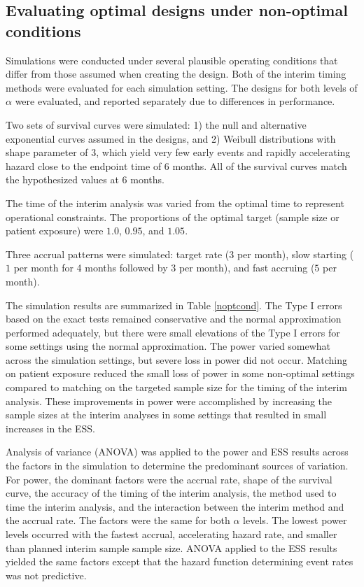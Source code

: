 \documentclass[12pt]{article}
\begin{document}
\clearpage

\subsection{Evaluating optimal designs under non-optimal conditions}
\label{simulations}

Simulations were conducted under several plausible operating conditions that differ from those
assumed when creating the design.  Both of the interim timing methods were evaluated for each simulation setting.  The designs for both levels of
$\alpha$ were evaluated, and reported separately due to differences in performance.

Two sets of survival curves were simulated: 1) the null and alternative exponential curves assumed in the designs, and 2) Weibull distributions with shape parameter of $3$, which yield very few early events and rapidly accelerating hazard close to the endpoint time of $6$ months.  All of the survival curves match the hypothesized values at $6$ months.

The time of the interim analysis was varied from the optimal time to represent operational
constraints. The proportions of the optimal target (sample size or patient exposure) were $1.0$,
$0.95$, and $1.05$.

Three accrual patterns were simulated:  target rate (3 per month), slow starting ($1$ per month for 4 months followed by $3$ per month), and fast accruing ($5$ per month).

The simulation results are summarized in Table \ref{noptcond}.  The Type I errors based on the
exact tests remained conservative and the normal approximation performed adequately, but there were
small elevations of the Type I errors for some settings using the normal approximation.  The power
varied somewhat across the simulation settings, but severe loss in power did not occur.  Matching
on patient exposure reduced the small loss of power in some non-optimal settings compared to
matching on the targeted sample size for the timing of the interim analysis.  These improvements in
power were accomplished by increasing the sample sizes at the interim analyses in some settings
that resulted in small increases in the ESS.

Analysis of variance (ANOVA) was applied to the power and ESS results across the factors in the
simulation to determine the predominant sources of variation.  For power, the dominant factors were the
accrual rate, shape of the survival curve, the accuracy of the timing of the interim analysis, the
method used to time the interim analysis, and the interaction between the interim method and the
accrual rate.  The factors were the same for both $\alpha$ levels.  The lowest power levels
occurred with the fastest accrual, accelerating hazard rate, and smaller than planned interim
sample sample size.  ANOVA applied to the ESS results yielded the same factors except that the
hazard function determining event rates was not predictive.
\end{document}
